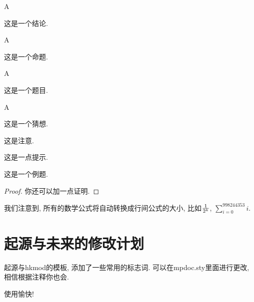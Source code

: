 \documentclass[a4,10pt]{ctexart}
\begin{document}
\begin{jl}{A}{}
        
这是一个结论.
    
\end{jl}

\begin{mt}{A}{}
        
这是一个命题.
    
\end{mt}

\begin{ti}{A}{}
        
这是一个题目.
    
\end{ti}

\begin{cx}{A}{}
        
这是一个猜想.
    
\end{cx}

\begin{zy}
        
这是注意.
    
\end{zy}

\begin{ts}
        
这是一点提示.
    
\end{ts}

\begin{lt}
        
这是一个例题.
    
\end{lt}

\begin{proof}
你还可以加一点证明. 
\end{proof}

我们注意到, 所有的数学公式将自动转换成行间公式的大小, 比如${1\over 2^k}$, $\sum_{i=0}^{998244353}i$. 

\section{起源与未来的修改计划}

起源与hkmod的模板, 添加了一些常用的标志词. 可以在mpdoc.sty里面进行更改, 相信根据注释你也会. 

使用愉快! 
\end{document}
